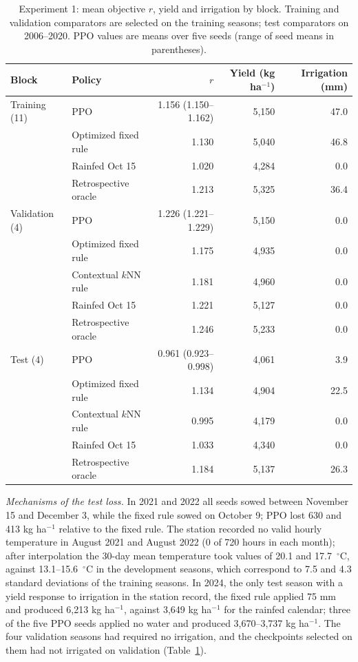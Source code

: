 \documentclass[times,final,authoryear]{elsarticle}
\begin{document}
\begin{table}[!h]
\centering
\scriptsize
\caption{Experiment 1: mean objective $r$, yield and irrigation by block. Training and validation comparators are selected on the training seasons; test comparators on 2006--2020. PPO values are means over five seeds (range of seed means in parentheses).}
\label{tab_by_split}
\begin{tabular}{llrrr}
\hline
Block & Policy & $r$ & Yield (kg ha$^{-1}$) & Irrigation (mm) \\
\hline
Training (11) & PPO & 1.156 (1.150--1.162) & 5,150 & 47.0 \\
              & Optimized fixed rule & 1.130 & 5,040 & 46.8 \\
              & Rainfed Oct 15 & 1.020 & 4,284 & 0.0 \\
              & Retrospective oracle & 1.213 & 5,325 & 36.4 \\
Validation (4) & PPO & 1.226 (1.221--1.229) & 5,150 & 0.0 \\
              & Optimized fixed rule & 1.175 & 4,935 & 0.0 \\
              & Contextual $k$NN rule & 1.181 & 4,960 & 0.0 \\
              & Rainfed Oct 15 & 1.221 & 5,127 & 0.0 \\
              & Retrospective oracle & 1.246 & 5,233 & 0.0 \\
Test (4)      & PPO & 0.961 (0.923--0.998) & 4,061 & 3.9 \\
              & Optimized fixed rule & 1.134 & 4,904 & 22.5 \\
              & Contextual $k$NN rule & 0.995 & 4,179 & 0.0 \\
              & Rainfed Oct 15 & 1.033 & 4,340 & 0.0 \\
              & Retrospective oracle & 1.184 & 5,137 & 26.3 \\
\hline
\end{tabular}
\end{table}

\emph{Mechanisms of the test loss.} In 2021 and 2022 all seeds sowed between November 15 and December 3, while the fixed rule sowed on October 9; PPO lost 630 and 413 kg ha$^{-1}$ relative to the fixed rule. The station recorded no valid hourly temperature in August 2021 and August 2022 (0 of 720 hours in each month); after interpolation the 30-day mean temperature took values of 20.1 and 17.7~$^{\circ}$C, against 13.1--15.6~$^{\circ}$C in the development seasons, which correspond to 7.5 and 4.3 standard deviations of the training seasons. In 2024, the only test season with a yield response to irrigation in the station record, the fixed rule applied 75 mm and produced 6,213 kg ha$^{-1}$, against 3,649 kg ha$^{-1}$ for the rainfed calendar; three of the five PPO seeds applied no water and produced 3,670--3,737 kg ha$^{-1}$. The four validation seasons had required no irrigation, and the checkpoints selected on them had not irrigated on validation (Table~\ref{tab_by_split}).
\end{document}
